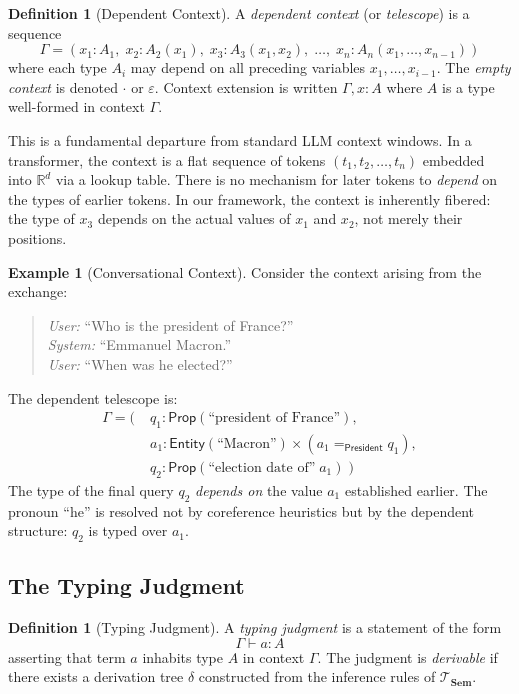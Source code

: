 \documentclass[11pt,a4paper]{article}
\theoremstyle{plain}
\theoremstyle{definition}
\newtheorem{definition}[theorem]{Definition}
\newtheorem{example}[theorem]{Example}
\theoremstyle{remark}
\newcommand{\Sem}{\mathbf{Sem}}
\begin{document}
\begin{definition}[Dependent Context]\label{def:context}
A \emph{dependent context} (or \emph{telescope}) is a sequence
\[
  \Gamma = (x_1 : A_1,\; x_2 : A_2(x_1),\; x_3 : A_3(x_1, x_2),\; \ldots,\; x_n : A_n(x_1, \ldots, x_{n-1}))
\]
where each type $A_i$ may depend on all preceding variables $x_1, \ldots, x_{i-1}$.
The \emph{empty context} is denoted $\cdot$ or $\varepsilon$.
Context extension is written $\Gamma, x : A$ where $A$ is a type well-formed in context $\Gamma$.
\end{definition}

This is a fundamental departure from standard LLM context windows.
In a transformer, the context is a flat sequence of tokens $(t_1, t_2, \ldots, t_n)$ embedded into $\mathbb{R}^d$ via a lookup table.
There is no mechanism for later tokens to \emph{depend} on the types of earlier tokens.
In our framework, the context is inherently fibered: the type of $x_3$ depends on the actual values of $x_1$ and $x_2$, not merely their positions.

\begin{example}[Conversational Context]\label{ex:context}
Consider the context arising from the exchange:
\begin{quote}
\emph{User:} ``Who is the president of France?''\\
\emph{System:} ``Emmanuel Macron.''\\
\emph{User:} ``When was he elected?''
\end{quote}
The dependent telescope is:
\begin{align*}
  \Gamma = (&\; q_1 : \mathsf{Prop}(\text{``president of France''}),\\
  &\; a_1 : \mathsf{Entity}(\text{``Macron''}) \times (a_1 =_{\mathsf{President}} q_1),\\
  &\; q_2 : \mathsf{Prop}(\text{``election date of''}\; a_1)\;)
\end{align*}
The type of the final query $q_2$ \emph{depends on} the value $a_1$ established earlier.
The pronoun ``he'' is resolved not by coreference heuristics but by the dependent structure: $q_2$ is typed over $a_1$.
\end{example}

\subsection{The Typing Judgment}

\begin{definition}[Typing Judgment]\label{def:judgment}
A \emph{typing judgment} is a statement of the form
\[
  \Gamma \vdash a : A
\]
asserting that term $a$ inhabits type $A$ in context $\Gamma$.
The judgment is \emph{derivable} if there exists a derivation tree $\delta$ constructed from the inference rules of $\mathcal{T}_{\Sem}$.
\end{definition}
\end{document}
